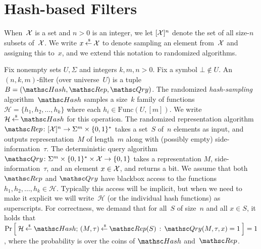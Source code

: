 \section{Hash-based Filters}
When~${\cal X}$ is a set and $n>0$ is an integer, we let $[{\cal X}]^n$ denote the set of all size-$n$ subsets of~${\cal X}$. We write $x {\:\stackrel{{\scriptscriptstyle \hspace{0.2em}\$}} {\leftarrow}\:} {\cal X}$ to denote sampling an element from~${\cal X}$ and assigning this to~$x$, and we extend this notation to randomized algorithms.


Fix nonempty sets $U,\Sigma$ and integers $k,m,n>0$.  Fix a symbol $\bot \not\in U$.
An $(n,k,m)$-filter (over universe~$U$) is a tuple $B=(\Hash,\Rep,\Qry)$.
%
The randomized \emph{hash-sampling} algorithm~$\Hash$ samples a
size~$k$ family of functions~$\mathcal{H}=\{h_1,h_2,\ldots,h_k\}$
where each $h_i \in \mathrm{Func}(U,[m])$.  
 We write $\mathcal{H} \getsr \Hash$ for
this operation.
%
The randomized representation algorithm $\Rep\colon [\univ]^n \rightarrow \Sigma^m \times \bits^*$ takes a set~$S$ of~$n$ elements as input, and outputs representation~$M$ of length~$m$ along with (possibly empty) side-information~$\tau$.
%
The deterministic query algorithm $\Qry\colon \Sigma^m \times \bits^* \times \univ \rightarrow \bits$ takes a representation $M$, side-information~$\tau$, and an element $x \in {\cal X}$, and returns a bit.
%
We assume that both $\Rep$ and $\Qry$ have blackbox access to the functions $h_1,h_2,\ldots,h_k \in \mathcal{H}$.  Typically this access will be implicit, but when we need to make it explicit we will write~$\mathcal{H}$ (or the individual hash functions) as superscripts.
%
For correctness, we demand that for all~$S$ of size~$n$ and all $x \in S$, it holds that $\Prob{\mathcal{H}\getsr\Hash;\,(M,\tau)\getsr\Rep(S)\,:\,\Qry(M,\tau,x)=1}=1$, where the probability is over the coins of $\Hash$ and~$\Rep$.


